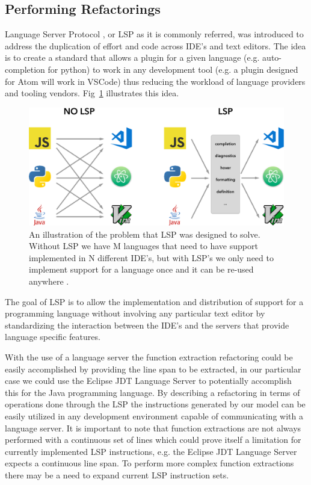 \subsection{Performing Refactorings}
\label{sec:lsp}

Language Server Protocol \citep{lsp}, or LSP as it is commonly referred, was introduced to address the duplication of effort and code across IDE's and text editors. The idea is to create a standard that allows a plugin for a given language (e.g. auto-completion for python) to work in any development tool (e.g. a plugin designed for Atom will work in VSCode) thus reducing the workload of language providers and tooling vendors. Fig~\ref{lsp_image} illustrates this idea.

\begin{figure}[!ht]
\centerline{\includegraphics[scale=0.26]{figuras/lsp-ilustracao.png}   }
\caption{An illustration of the problem that LSP was designed to solve. Without LSP we have M languages that need to have support implemented in N different IDE's, but with LSP's we only need to implement support for a language once and it can be re-used anywhere \citep{lsp_ilustracao}.}
\label{lsp_image}
\end{figure}


The goal of LSP is to allow the implementation and distribution of support for a programming language without involving any particular text editor by standardizing  the interaction between the IDE's and the servers that provide language specific features.

With the use of a language server the function extraction refactoring could be easily accomplished by providing the line span to be extracted, in our particular case we could use the Eclipse JDT Language Server \citep{lsp_jdt} to potentially accomplish this for the Java programming language. By describing a refactoring in terms of operations done through the LSP the instructions generated by our model can be easily utilized in any development environment capable of communicating with a language server. It is important to note that function extractions are not always performed with a continuous set of lines which could prove itself a limitation for currently implemented LSP instructions, e.g. the Eclipse JDT Language Server expects a continuous line span. To perform more complex function extractions there may be a need to expand current LSP instruction sets.

